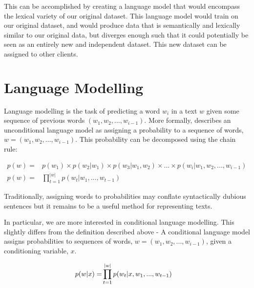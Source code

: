 \documentclass[12pt,twoside]{report}
\begin{document}
This can be accomplished by creating a language model that would encompass the lexical variety of our original dataset. This language model would train on our original dataset, and would produce data that is semantically and lexically similar to our original data, but diverges enough such that it could potentially be seen as an entirely new and independent dataset. This new dataset can be assigned to other clients.


\section{Language Modelling}

Language modelling is the task of predicting a word $w_i$ in a text $w$ given some sequence of previous words $(w_1, w_2, ..., w_{i-1})$. More formally, \cite{dyer_conditional_2017} describes an unconditional language model as assigning a probability to a sequence of words,  $w = (w_1, w_2, ..., w_{i-1})$. This probability can be decomposed using the chain rule:

\begin{align}
p(w) = &{} p(w_1) \times p(w_2|w_1) \times p(w_3|w_1, w_2) \times ... \times p(w_i|w_1, w_2, ..., w_{i-1}) \\
p(w) = &{} \prod^{|w|}_{t=1}p(w_t|w_1, ..., w_{t-1})
\end{align}

Traditionally, assigning words to probabilities may conflate syntactically dubious sentences but it remains to be a useful method for representing texts.  

In particular, we are more interested in conditional language modelling. This slightly differs from the definition described above - A conditional language model assigns probabilities to sequences of words, $w = (w_1, w_2, ..., w_{i-1})$, given a conditioning variable, $x$. 

\begin{align}
	p(\boldmath{w}|x) = &{} \prod^{|w|}_{t=1}p(w_t|x,w_1, ..., w_{t-1})
\end{align}
\end{document}

